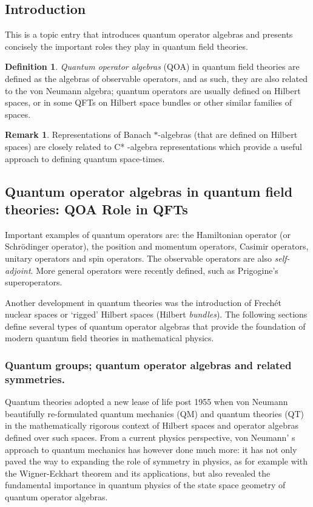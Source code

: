 \documentclass[12pt]{article}
\theoremstyle{plain}
\theoremstyle{definition}
\newtheorem{definition}{Definition}[section]
\newtheorem{remark}{Remark}[section]
\numberwithin{equation}{section}
\newcommand{\<}{{\langle}}
\begin{document}
\subsection{Introduction}
This is a topic entry that introduces quantum operator algebras and presents concisely the important
roles they play in quantum field theories.

\begin{definition} {\em Quantum operator algebras} (QOA) in quantum field theories are
defined as the algebras of observable operators, and as such, they are also related to the von Neumann algebra; 
quantum operators are usually defined on Hilbert spaces, or in some QFTs on Hilbert space bundles
or other similar families of spaces. 
\end{definition}

\begin{remark}
 Representations of Banach $*$-algebras (that are defined on Hilbert spaces) are closely related
to C* -algebra representations which provide a useful approach to defining quantum space-times. 
\end{remark}

\subsection{Quantum operator algebras in quantum field theories: QOA Role in QFTs}

 Important examples of quantum operators are: the Hamiltonian operator (or Schr\"odinger operator), the position and momentum operators, Casimir operators, unitary operators and spin operators. The observable operators are also {\em self-adjoint}. More general operators were recently defined, such as Prigogine's superoperators. 

 Another development in quantum theories was the introduction of Frech\'et nuclear spaces or `rigged' Hilbert spaces (Hilbert {\em bundles}). The following sections define several types of quantum operator algebras that provide the foundation of modern quantum field theories in mathematical physics. 


\subsubsection{Quantum groups; quantum operator algebras and related symmetries.}

 Quantum theories adopted a new lease of life post 1955 when von Neumann beautifully re-formulated quantum mechanics (QM) and quantum theories (QT) in the mathematically rigorous context of Hilbert spaces and operator
algebras defined over such spaces. From a current physics perspective, 
von Neumann' s approach to quantum mechanics has however done much more: it has
not only paved the way to expanding the role of symmetry in physics, as for example with the Wigner-Eckhart theorem and its applications, but also revealed the fundamental importance in quantum physics of the state space geometry of quantum operator algebras.
\end{document}
